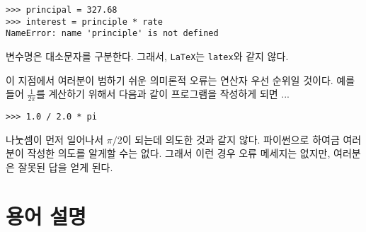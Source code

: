 \beforeverb
\begin{verbatim}
>>> principal = 327.68
>>> interest = principle * rate
NameError: name 'principle' is not defined
\end{verbatim}
\afterverb
%
변수명은 대소문자를 구분한다. 그래서, {\tt LaTeX}는 {\tt latex}와 같지 않다.


이 지점에서 여러분이 범하기 쉬운 의미론적 오류는 연산자 우선 순위일 것이다. 
예를 들어 $\frac{1}{2 \pi}$를 계산하기 위해서 다음과 같이 프로그램을 작성하게 되면 ...


\beforeverb
\begin{verbatim}
>>> 1.0 / 2.0 * pi
\end{verbatim}
\afterverb
%
나눗셈이 먼저 일어나서 $\pi / 2$이 되는데 의도한 것과 같지 않다. 
파이썬으로 하여금 여러분이 작성한 의도를 알게할 수는 없다. 
그래서 이런 경우 오류 메세지는 없지만, 여러분은 잘못된 답을 얻게 된다.



\section{용어 설명}

